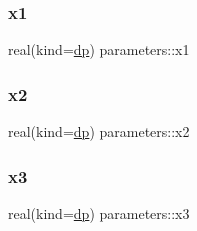 \subsubsection{\texorpdfstring{x1}{x1}}
{\footnotesize\ttfamily real(kind=\mbox{\hyperlink{namespaceparameters_a52f8c6351fd79345d8811e065bcbbb37}{dp}}) parameters\+::x1}

\mbox{\label{group__SKYRME__PARS_ga505cd8d8fea1c311291e29cfb0516c91}} 
\subsubsection{\texorpdfstring{x2}{x2}}
{\footnotesize\ttfamily real(kind=\mbox{\hyperlink{namespaceparameters_a52f8c6351fd79345d8811e065bcbbb37}{dp}}) parameters\+::x2}

\mbox{\label{group__SKYRME__PARS_ga361bcdef664c7f70557bcc2f42b2abce}} 
\subsubsection{\texorpdfstring{x3}{x3}}
{\footnotesize\ttfamily real(kind=\mbox{\hyperlink{namespaceparameters_a52f8c6351fd79345d8811e065bcbbb37}{dp}}) parameters\+::x3}

